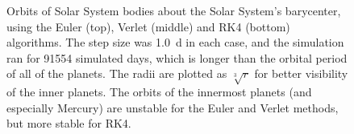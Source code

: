 \documentclass[aps,prc,reprint,nobalancelastpage]{revtex4-1}
\begin{document}
\begin{figure}
            \caption{Orbits of Solar System bodies about the Solar System's barycenter, using the Euler (top), Verlet (middle) and RK4 (bottom) algorithms. The step size was \SI{1.0}{d} in each case, and the simulation ran for 91554 simulated days, which is longer than the orbital period of all of the planets. The radii are plotted as $\sqrt[3]{r}$ for better visibility of the inner planets. The orbits of the innermost planets (and especially Mercury) are unstable for the Euler and Verlet methods, but more stable for RK4.}
            \label{fig:system}
        \end{figure}
\end{document}
